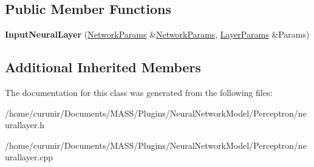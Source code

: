 \subsection*{Public Member Functions}
\begin{DoxyCompactItemize}
\item 
{\bfseries Input\+Neural\+Layer} (\hyperlink{struct_perceptron_1_1_network_params}{Network\+Params} \&\hyperlink{struct_perceptron_1_1_network_params}{Network\+Params}, \hyperlink{struct_perceptron_1_1_layer_params}{Layer\+Params} \&Params)\hypertarget{class_input_neural_layer_a2e0edec20cf09e830fdeaee505688b1a}{}\label{class_input_neural_layer_a2e0edec20cf09e830fdeaee505688b1a}

\end{DoxyCompactItemize}
\subsection*{Additional Inherited Members}


The documentation for this class was generated from the following files\+:\begin{DoxyCompactItemize}
\item 
/home/curunir/\+Documents/\+M\+A\+S\+S/\+Plugins/\+Neural\+Network\+Model/\+Perceptron/neurallayer.\+h\item 
/home/curunir/\+Documents/\+M\+A\+S\+S/\+Plugins/\+Neural\+Network\+Model/\+Perceptron/neurallayer.\+cpp\end{DoxyCompactItemize}
